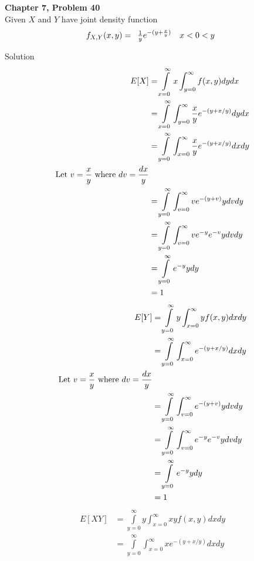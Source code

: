 \documentclass{article}
\begin{document}
\begin{spacing}{1.1}
\newpage
\begin{homeworkProblem}
  {\bf Chapter 7, Problem 40}\\
  Given $X$ and $Y$ have joint density function
  \[
    f_{X, Y}( x, y) = \begin{array}{l l}
      \frac{ 1}{ y} e^{-(y + \frac{ x}{ y})} & x < 0 < y\\
    \end{array}
  \]
  \begin{homeworkSection}{Solution}
    \begin{align*}
      E[ X] &= \int\limits_{x = 0}^\infty x \int_{y = 0}^\infty f( x, y) dy dx\\
      &= \int\limits_{x = 0}^\infty \int_{y = 0}^\infty \frac{ x}{ y} e^{-(y + x / y)} dy dx\\
      &= \int\limits_{y = 0}^\infty \int_{x = 0}^\infty \frac{ x}{ y} e^{-(y + x / y)} dx dy\\
      \text{Let $ v = \frac{ x}{ y}$ where $dv = \frac{ dx}{ y}$}\\
      &= \int\limits_{y = 0}^\infty \int_{v = 0}^\infty v e^{-(y + v)} y dv dy\\
      &= \int\limits_{y = 0}^\infty \int_{v = 0}^\infty v e^{-y} e^{-v} y dv dy\\
      &= \int\limits_{y = 0}^\infty e^{-y} y dy\\
      &= 1
    \end{align*}
    \begin{align*}
      E[ Y] &= \int\limits_{y = 0}^\infty y \int_{x = 0}^\infty y f( x, y) dx dy\\
      &= \int\limits_{y = 0}^\infty \int_{x = 0}^\infty e^{-(y + x / y)} dx dy\\
      \text{Let $ v = \frac{ x}{ y}$ where $dv = \frac{ dx}{ y}$}\\
      &= \int\limits_{y = 0}^\infty \int_{v = 0}^\infty e^{-(y + v)} y dv dy\\
      &= \int\limits_{y = 0}^\infty \int_{v = 0}^\infty e^{-y} e^{-v} y dv dy\\
      &= \int\limits_{y = 0}^\infty  e^{-y} y dy\\
      &= 1
    \end{align*}
    \begin{align*}
      E[ XY] &= \int\limits_{y = 0}^\infty y \int_{x = 0}^\infty xy f( x, y) dx dy\\
      &= \int\limits_{y = 0}^\infty \int_{x = 0}^\infty xe^{-(y + x / y)} dx dy\\

\end{align*}
\end{homeworkSection}
\end{homeworkProblem}
\end{spacing}
\end{document}
